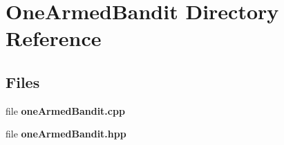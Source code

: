 \section{One\+Armed\+Bandit Directory Reference}
\label{dir_1144d9ffa18389b3ce0a93170cc3bf5f}
\subsection*{Files}
\begin{DoxyCompactItemize}
\item 
file \textbf{ one\+Armed\+Bandit.\+cpp}
\item 
file \textbf{ one\+Armed\+Bandit.\+hpp}
\end{DoxyCompactItemize}
